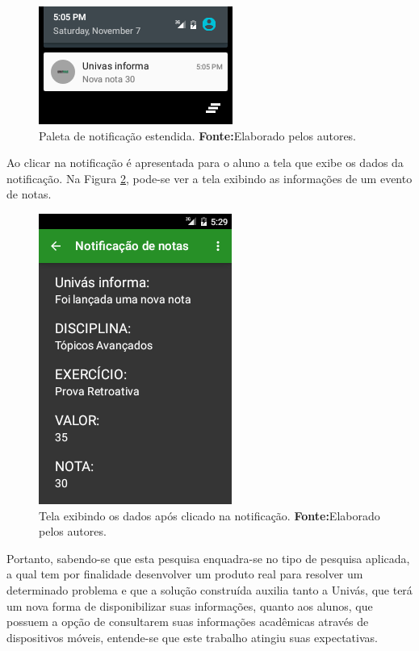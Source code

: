 \begin{figure}[h!]
    \centerline{\includegraphics[scale=0.8]{./imagens/3_discussao_resultados/dr3.png}}
    \caption[Paleta de notificação estendida]{Paleta de notificação estendida.
        \textbf{Fonte:}Elaborado pelos autores.}
    \label{fig:dr3}
\end{figure}

\pagebreak

    \par Ao clicar na notificação é apresentada para o aluno a tela que exibe os
dados da notificação. Na Figura \ref{fig:dr4}, pode-se ver a tela exibindo as
informações de um evento de notas.

\begin{figure}[h!]
    \centerline{\includegraphics[scale=0.8]{./imagens/3_discussao_resultados/dr4.png}}
    \caption[Tela exibindo os dados após clicado na notificação]{Tela exibindo os
    dados após clicado na notificação.
    \textbf{Fonte:}Elaborado pelos autores.}
    \label{fig:dr4}
\end{figure}

    \par Portanto, sabendo-se que esta pesquisa enquadra-se no tipo de pesquisa
aplicada, a qual tem por finalidade desenvolver um produto real para resolver
um determinado problema e que a solução construída auxilia tanto a Univás, que
terá um nova forma de disponibilizar suas informações, quanto aos alunos, que
possuem a opção de consultarem suas informações acadêmicas através de
dispositivos móveis, entende-se que este trabalho atingiu suas expectativas.    
